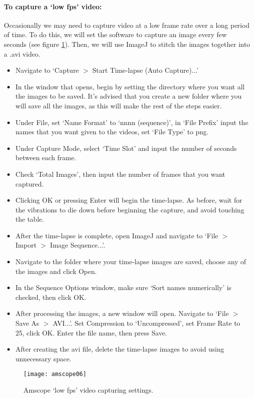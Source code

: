 \paragraph*{To capture a `low fps' video:}
Occasionally we may need to capture video at a low frame rate over a long period of time.
To do this, we will set the software to capture an image every few seconds (see figure \ref{fig:low-fps}).
Then, we will use ImageJ to stitch the images together into a .avi video.
\begin{itemize}
\item Navigate to `Capture $>$ Start Time-lapse (Auto Capture)...'
\item In the window that opens, begin by setting the directory where you want all the images to be saved. It's advised that you create a new folder where you will save all the images, as this will make the rest of the steps easier.
\item Under File, set `Name Format' to `nnnn (sequence)', in `File Prefix' input the names that you want given to the videos, set `File Type' to png.
\item Under Capture Mode, select `Time Slot' and input the number of seconds between each frame.
\item Check `Total Images', then input the number of frames that you want captured.
\item Clicking OK or pressing Enter will begin the time-lapse. As before, wait for the vibrations to die down before beginning the capture, and avoid touching the table.
\item After the time-lapse is complete, open ImageJ and navigate to `File $>$ Import $>$ Image Sequence...'.
\item Navigate to the folder where your time-lapse images are saved, choose any of the images and click Open.
\item In the Sequence Options window, make sure `Sort names numerically' is checked, then click OK.
\item After processing the images, a new window will open. Navigate to `File $>$ Save As $>$ AVI...'. Set Compression to `Uncompressed', set Frame Rate to 25, click OK. Enter the file name, then press Save.
\item After creating the avi file, delete the time-lapse images to avoid using unnecessary space.
\end{itemize}

\begin{figure}[h]
	\centering
	\texttt{[image: amscope06]}
	\caption{Amscope `low fps' video capturing settings.}
	\label{fig:low-fps}
\end{figure}

